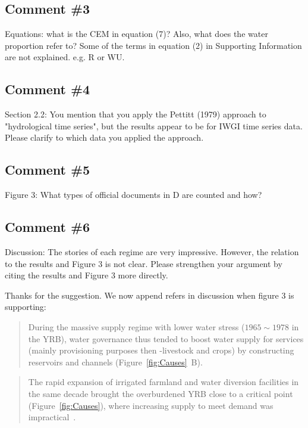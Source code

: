 \subsection{Comment \#3}
\RC{} Equations: what is the CEM in equation (7)? Also, what does the water proportion refer to? Some of the terms in equation (2) in Supporting Information are not explained. e.g. R or WU.　

\subsection{Comment \#4}
\RC{} Section 2.2: You mention that you apply the Pettitt (1979) approach to "hydrological time series", but the results appear to be for IWGI time series data. Please clarify to which data you applied the approach.

\subsection{Comment \#5}
\RC{} Figure 3: What types of official documents in D are counted and how?


\subsection{Comment \#6}
\RC{} Discussion: The stories of each regime are very impressive. However, the relation to the results and Figure 3 is not clear. Please strengthen your argument by citing the results and Figure 3 more directly.

\AR{} Thanks for the suggestion. We now append refers in discussion when figure 3 is supporting:

\begin{quote}
    During the massive supply regime with lower water stress ($1965 \sim 1978$ in the YRB), water governance thus tended to boost water supply for services (mainly provisioning purposes then -livestock and crops) by constructing reservoirs and channels (Figure~\ref{fig:Causes}~B).
\end{quote}

\begin{quote}
    The rapid expansion of irrigated farmland and water diversion facilities in the same decade brought the overburdened YRB close to a critical point (Figure~\ref{fig:Causes}), where increasing supply to meet demand was impractical~\cite{loch2020}.
\end{quote}

